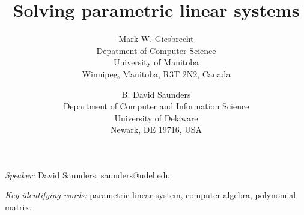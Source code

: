 %
%
%
%
%
%
%
%
%
%
%
%

\setlength{\textheight}{9.0in}
\setlength{\textwidth}{6.2in}
\addtolength{\topmargin}{-1.0in}
\addtolength{\oddsidemargin}{-0.5in}


\title{Solving parametric linear systems}
\author{
Mark W. Giesbrecht\\
Depatment of Computer Science\\
University of Manitoba\\
Winnipeg,  Manitoba, R3T 2N2, Canada\\
\and
B. David Saunders\\
Department of Computer and Information Science\\
University of Delaware\\
Newark, DE 19716, USA\\
}

\date{}
\maketitle

\noindent
{\it Speaker:} David Saunders:
saunders@udel.edu

\medskip
\noindent
{\it Key identifying words:} parametric linear system, computer
algebra, polynomial matrix.

